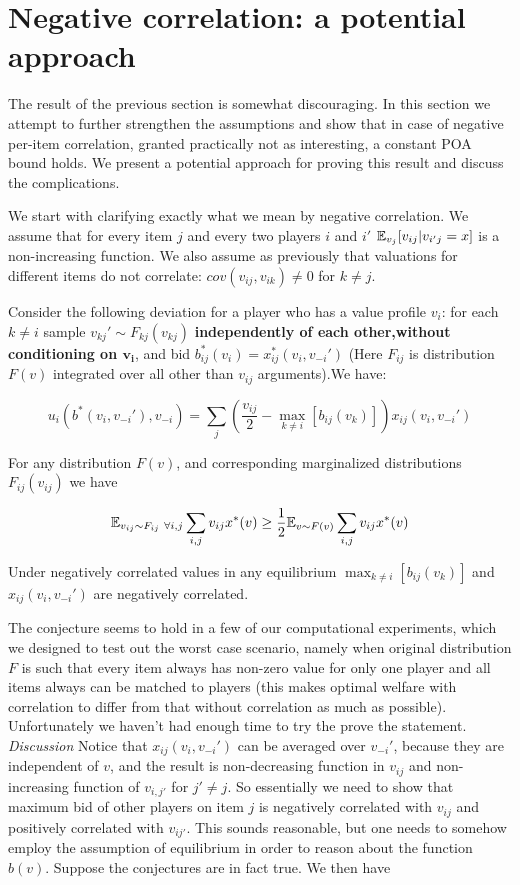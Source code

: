 \section{Negative correlation: a potential approach}
The result of the previous section is somewhat discouraging. In this section we attempt to further strengthen the assumptions and show that in case of negative per-item correlation, granted practically not as interesting, a constant POA bound holds. We present a potential approach for proving this result and discuss the complications.

We start with clarifying exactly what we mean by negative correlation. We assume that for every item $j$ and every two players $i$ and $i'$ ${\mathbb{E}}_{v_j}[v_{ij}|v_{i'j}=x]$ is a non-increasing function. We also assume as previously that valuations for different items do not correlate: $cov(v_{ij},v_{ik})\neq 0$ for $k\neq j$.

Consider the following deviation for a player who has a value profile $v_i$: for each $k\neq i$ sample $v_{kj}'\sim F_{kj}(v_{kj})$ \textbf{independently of each other,without conditioning on $\mathbf{v_i}$}, and bid $b_{ij}^*(v_i) = x^*_{ij}(v_i,v_{-i}')$ (Here $F_{ij}$ is distribution $F(v)$ integrated over all other than $v_{ij}$ arguments).We have:

$$u_i(b^*(v_i,v_{-i}'),v_{-i}) = \sum_j \left ( \frac{v_{ij}}{2}-\max_{k\neq i}[b_{ij}(v_k)]\right)x_{ij}(v_i,v_{-i}')$$


\begin{conjecture}
For any distribution $F(v)$, and corresponding marginalized distributions $F_{ij}(v_{ij})$ we have

$${\mathbb{E}}_{v_{ij}\sim F_{ij}\ \forall i,j} \sum_{i,j} v_{ij}x^*(v)\geq \frac{1}{2}{\mathbb{E}}_{v \sim F(v)}  \sum_{i,j} v_{ij}x^*(v)$$
\end{conjecture}



\begin{conjecture}
Under negatively correlated values in any equilibrium $\max_{k\neq i}[b_{ij}(v_k)]$ and $x_{ij}(v_i,v_{-i}')$ are negatively correlated.
\end{conjecture}
The conjecture seems to hold in a few of our computational experiments, which we designed to test out the worst case scenario, namely when original distribution $F$ is such that every item always has non-zero value for only one player and all items always can be matched to players (this makes optimal welfare with correlation to differ from that without correlation as much as possible). Unfortunately we haven't had enough time to try the prove the statement.
\textit{Discussion} Notice that $x_{ij}(v_i,v_{-i}')$ can be averaged over $v_{-i}'$, because they are independent of $v$, and the result is non-decreasing function in $v_{ij}$ and non-increasing function of $v_{i,j'}$ for $j'\neq j$. So essentially we need to show that maximum bid of other players on item $j$ is negatively correlated with $v_{ij}$ and positively correlated with $v_{ij'}$. This sounds reasonable, but one needs to somehow employ the assumption of equilibrium in order to reason about the function $b(v)$.
\bigskip
\newline Suppose the conjectures are in fact true. We then have

